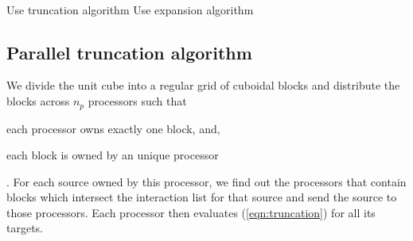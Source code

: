 {\tt
\begin{algorithmic}
\STATE
     \STATE Use truncation algorithm 
  \ELSE 
     \STATE Use expansion algorithm
  \ENDIF
\STATE
\end{algorithmic}
}


\subsection{Parallel truncation algorithm}
We divide the unit cube into a regular grid of cuboidal blocks and distribute the blocks across $n_p$ processors
 such that \begin{inparaenum}
\item each processor owns exactly one block, and, \item each block is owned by an unique processor\end{inparaenum}.
 For each source owned by this processor, we find out the processors that contain blocks which intersect the interaction list
 for that source and send the source to those processors. Each processor then evaluates (\ref{eqn:truncation}) for all its targets.
 

